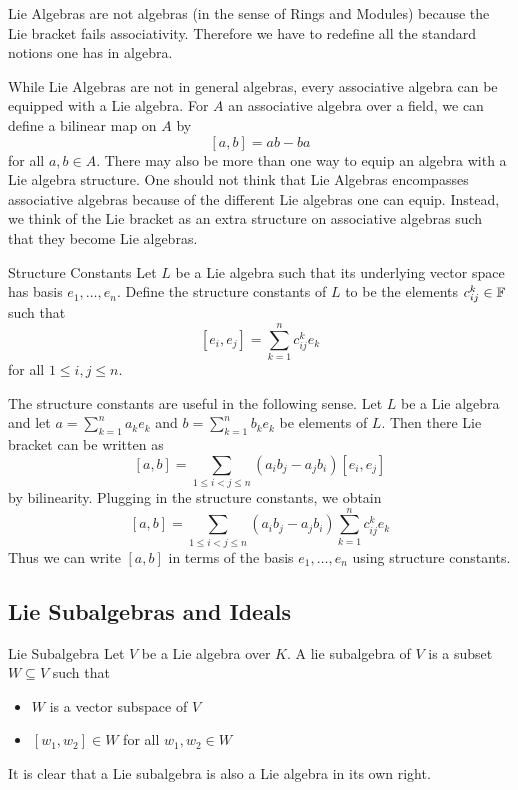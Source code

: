 \documentclass[a4paper]{article}
\begin{document}
Lie Algebras are not algebras (in the sense of Rings and Modules) because the Lie bracket fails associativity. Therefore we have to redefine all the standard notions one has in algebra. 

While Lie Algebras are not in general algebras, every associative algebra can be equipped with a Lie algebra. For $A$ an associative algebra over a field, we can define a bilinear map on $A$ by $$[a,b]=ab-ba$$ for all $a,b\in A$. There may also be more than one way to equip an algebra with a Lie algebra structure. One should not think that Lie Algebras encompasses associative algebras because of the different Lie algebras one can equip. Instead, we think of the Lie bracket as an extra structure on associative algebras such that they become Lie algebras. 

\begin{defn}{Structure Constants}{} Let $L$ be a Lie algebra such that its underlying vector space has basis $e_1,\dots,e_n$. Define the structure constants of $L$ to be the elements $c_{ij}^k\in\mathbb{F}$ such that $$[e_i,e_j]=\sum_{k=1}^nc_{ij}^ke_k$$ for all $1\leq i,j\leq n$. 
\end{defn}

The structure constants are useful in the following sense. Let $L$ be a Lie algebra and let $a=\sum_{k=1}^na_ke_k$ and $b=\sum_{k=1}^nb_ke_k$ be elements of $L$. Then there Lie bracket can be written as $$[a,b]=\sum_{1\leq i<j\leq n}(a_ib_j-a_jb_i)[e_i,e_j]$$ by bilinearity. Plugging in the structure constants, we obtain $$[a,b]=\sum_{1\leq i<j\leq n}(a_ib_j-a_jb_i)\sum_{k=1}^nc_{ij}^ke_k$$ Thus we can write $[a,b]$ in terms of the basis $e_1,\dots,e_n$ using structure constants. 

\subsection{Lie Subalgebras and Ideals}
\begin{defn}{Lie Subalgebra}{} Let $V$ be a Lie algebra over $K$. A lie subalgebra of $V$ is a subset $W\subseteq V$ such that 
\begin{itemize}
\item $W$ is a vector subspace of $V$
\item $[w_1,w_2]\in W$ for all $w_1,w_2\in W$
\end{itemize}
\end{defn}

It is clear that a Lie subalgebra is also a Lie algebra in its own right. 
\end{document}
